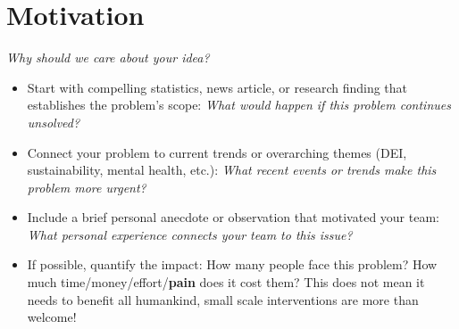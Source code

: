 \section{Motivation}
\emph{Why should we care about your idea?}

\begin{itemize}
    \item Start with compelling statistics, news article, or research finding that establishes the problem's scope: \emph{What would happen if this problem continues unsolved?}
    \item Connect your problem to current trends or overarching themes (DEI, sustainability, mental health, etc.): \emph{What recent events or trends make this problem more urgent?}
    \item Include a brief personal anecdote or observation that motivated your team: \emph{What personal experience connects your team to this issue?}
    \item If possible, quantify the impact: How many people face this problem? How much time/money/effort/\textbf{pain} does it cost them? This does not mean it needs to benefit all humankind, small scale interventions are more than welcome!
\end{itemize}